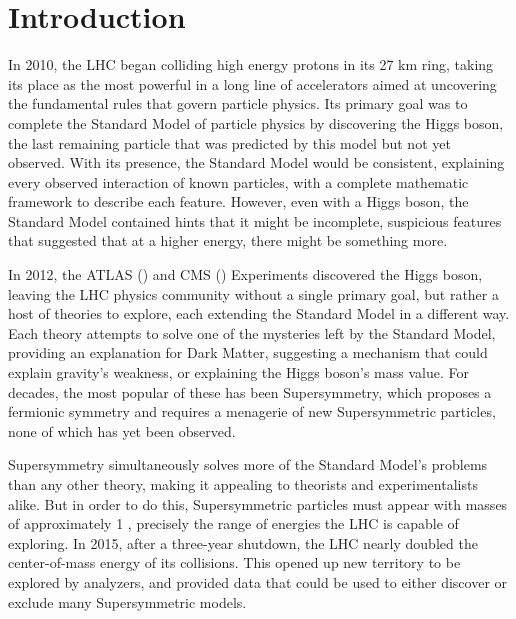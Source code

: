 
\chapter{Introduction} %

\label{ch:introduction} %


In 2010, the \acf{LHC} began colliding high energy protons in its 27 km ring, taking its place as the most powerful in a long line of accelerators aimed at uncovering the fundamental rules that govern particle physics. Its primary goal was to complete the Standard Model of particle physics by discovering the Higgs boson, the last remaining particle that was predicted by this model but not yet observed. With its presence, the Standard Model would be consistent, explaining every observed interaction of known particles, with a complete mathematic framework to describe each feature. However, even with a Higgs boson, the Standard Model contained hints that it might be incomplete, suspicious features that suggested that at a higher energy, there might be something more.

In 2012, the \acs{ATLAS} () and \acs{CMS} () Experiments discovered the Higgs boson, leaving the \ac{LHC} physics community without a single primary goal, but rather a host of theories to explore, each extending the Standard Model in a different way. Each theory attempts to solve one of the mysteries left by the Standard Model, providing an explanation for Dark Matter, suggesting a mechanism that could explain gravity's weakness, or explaining the Higgs boson's mass value. For decades, the most popular of these has been Supersymmetry, which proposes a fermionic symmetry and requires a menagerie of new Supersymmetric particles, none of which has yet been observed. 

Supersymmetry simultaneously solves more of the Standard Mo\-del's problems than any other theory, making it appealing to theorists and experimentalists alike. But in order to do this, Supersymmetric particles must appear with masses of approximately 1 \tev, precisely the range of energies the \ac{LHC} is capable of exploring. In 2015, after a three-year shutdown, the \ac{LHC} nearly doubled the center-of-mass energy of its collisions. This opened up new territory to be explored by analyzers, and provided data that could be used to either discover or exclude many Supersymmetric models.

